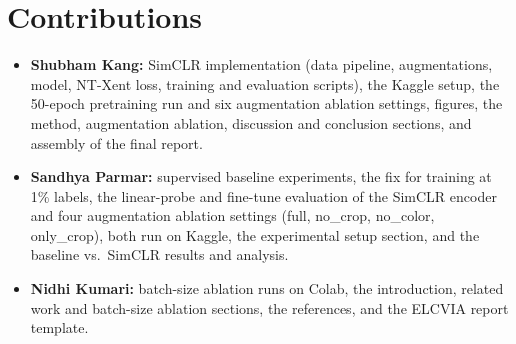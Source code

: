 \documentclass[twoside,a4paper,11pt]{article}
\begin{document}
\section*{Contributions}

\begin{itemize}
  \item \textbf{Shubham Kang:} SimCLR implementation (data pipeline, augmentations,
        model, NT-Xent loss, training and evaluation scripts), the Kaggle setup, the
        50-epoch pretraining run and six augmentation ablation settings, figures, the
        method, augmentation ablation, discussion and conclusion sections, and
        assembly of the final report.
  \item \textbf{Sandhya Parmar:} supervised baseline experiments, the fix for training
        at 1\% labels, the linear-probe and fine-tune evaluation of the SimCLR encoder
        and four augmentation ablation settings (full, no\_crop, no\_color, only\_crop),
        both run on Kaggle, the experimental setup section, and the baseline vs.\
        SimCLR results and analysis.
  \item \textbf{Nidhi Kumari:} batch-size ablation runs on Colab, the introduction,
        related work and batch-size ablation sections, the references, and the ELCVIA
        report template.
\end{itemize}
\end{document}
